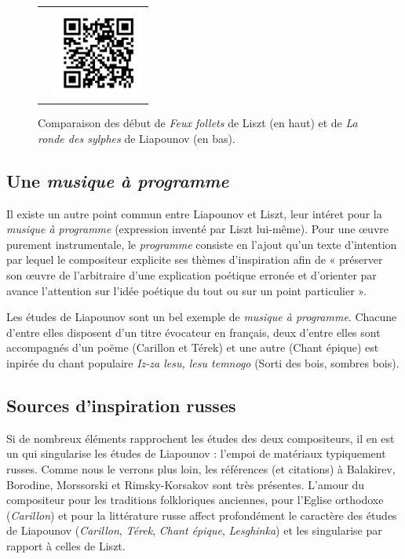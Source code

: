\begin{figure}[!p]
\begin{bigcenter}
\begin{tabular}{lr}
      &
      \includegraphics[width=3cm, keepaspectratio]{op11-xi-qr.png}
    \end{tabular}
  \end{bigcenter}
  \caption{\label{op11-xi}Comparaison des début de \emph{Feux follets} de Liszt (en haut) et de \emph{La ronde des sylphes} de Liapounov (en bas).}
\end{figure}

\subsection{Une \emph{musique à programme}}

Il existe un autre point commun entre Liapounov et Liszt, leur intéret pour la \emph{musique à programme} (expression inventé par Liszt lui-même). Pour une œuvre purement instrumentale, le \emph{programme} consiste en l'ajout qu'un texte d'intention par lequel le compositeur explicite ses thèmes d'inspiration afin de « préserver son œuvre de l'arbitraire d'une explication poétique erronée et d'orienter par avance l'attention sur l'idée poétique du tout ou sur un point particulier ».

Les études de Liapounov sont un bel exemple de \emph{musique à programme}. Chacune d'entre elles disposent d'un titre évocateur en français, deux d'entre elles sont accompagnés d'un poëme (Carillon et Térek) et une autre (Chant épique) est inpirée du chant populaire \emph{Iz-za lesu, lesu temnogo} (Sorti des bois, sombres bois). 

\subsection{Sources d'inspiration russes}

Si de nombreux éléments rapprochent les études des deux compositeurs, il en est un qui singularise les études de Liapounov : l'empoi de matériaux typiquement russes. Comme nous le verrons plus loin, les références (et citations) à Balakirev, Borodine, Morssorski et Rimsky-Korsakov sont très présentes. L'amour du compositeur pour les traditions folkloriques anciennes, pour l'Eglise orthodoxe (\emph{Carillon}) et pour la littérature russe affect profondément le caractère des études de Liapounov (\emph{Carillon}, \emph{Térek}, \emph{Chant épique}, \emph{Lesghinka}) et les singularise par rapport à celles de Liszt.

